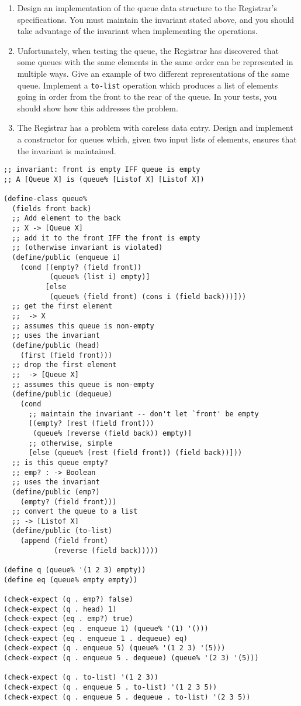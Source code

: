 \documentclass[12pt]{article}                   %
\newenvironment{solution}{}{}
\newcommand\code[1]{\texttt{#1}}
\begin{document}
\begin{problem}
\begin{enumerate}
\item Design an implementation of the queue data structure to the Registrar's
  specifications.  You must maintain the invariant stated above, and
  you should take advantage of the invariant when implementing the
  operations.
\item Unfortunately, when testing the queue, the Registrar has
  discovered that some queues with the same elements in the same order
  can be represented in multiple ways.  Give an example of two
  different representations of the same queue.  Implement a
  \code{to-list} operation which produces a list of elements going in
  order from the front to the rear of the queue. In your tests, you
  should show how this addresses the problem.
\item The Registrar has a problem with careless data entry.  Design
  and implement a constructor for queues which, given two input lists
  of elements, ensures that the invariant is maintained.  
\end{enumerate}

\begin{solution}
\begin{verbatim}
;; invariant: front is empty IFF queue is empty
;; A [Queue X] is (queue% [Listof X] [Listof X])

(define-class queue%
  (fields front back)
  ;; Add element to the back
  ;; X -> [Queue X]
  ;; add it to the front IFF the front is empty
  ;; (otherwise invariant is violated)
  (define/public (enqueue i)
    (cond [(empty? (field front))
           (queue% (list i) empty)]
          [else
           (queue% (field front) (cons i (field back)))]))
  ;; get the first element
  ;;  -> X
  ;; assumes this queue is non-empty
  ;; uses the invariant
  (define/public (head)
    (first (field front)))
  ;; drop the first element
  ;;  -> [Queue X]
  ;; assumes this queue is non-empty
  (define/public (dequeue)
    (cond 
      ;; maintain the invariant -- don't let `front' be empty
      [(empty? (rest (field front)))
       (queue% (reverse (field back)) empty)]
      ;; otherwise, simple
      [else (queue% (rest (field front)) (field back))]))
  ;; is this queue empty?
  ;; emp? : -> Boolean
  ;; uses the invariant
  (define/public (emp?)
    (empty? (field front)))
  ;; convert the queue to a list
  ;; -> [Listof X] 
  (define/public (to-list)
    (append (field front)
            (reverse (field back)))))

(define q (queue% '(1 2 3) empty))
(define eq (queue% empty empty))

(check-expect (q . emp?) false)
(check-expect (q . head) 1)
(check-expect (eq . emp?) true)
(check-expect (eq . enqueue 1) (queue% '(1) '()))
(check-expect (eq . enqueue 1 . dequeue) eq)
(check-expect (q . enqueue 5) (queue% '(1 2 3) '(5)))
(check-expect (q . enqueue 5 . dequeue) (queue% '(2 3) '(5)))

(check-expect (q . to-list) '(1 2 3))
(check-expect (q . enqueue 5 . to-list) '(1 2 3 5))
(check-expect (q . enqueue 5 . dequeue . to-list) '(2 3 5))
\end{verbatim}
\end{solution}
\end{problem}
\end{document}
